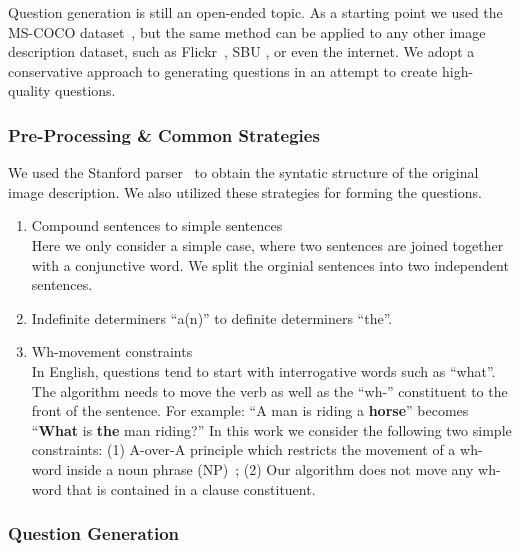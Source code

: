 \documentclass{article} %
\renewcommand{\#}[1]{\textbf{#1}}
\begin{document}
Question generation is still an open-ended topic. As a starting point we used
the MS-COCO dataset~\cite{mscoco}, but the same method can be applied to any
other image description dataset, such as Flickr~\cite{flickr8k}, SBU
\cite{ordonez11}, or even the internet. We adopt a conservative approach to
generating questions in an attempt to create high-quality questions.

\subsubsection{Pre-Processing \& Common Strategies}

We used the Stanford parser~\cite{klein03} to obtain the syntatic structure of
the original image description. We also utilized these strategies for forming
the questions.

\begin{enumerate}[leftmargin=*]

\item Compound sentences to simple sentences \\ Here we only consider a simple
case, where two sentences are joined together with a conjunctive word. We split
the orginial sentences into two independent sentences.

\item Indefinite determiners ``a(n)'' to definite determiners ``the''.

\item Wh-movement constraints \\ In English, questions tend to start with
interrogative words such as ``what''. The algorithm needs to move the verb as
well as the ``wh-'' constituent to the front of the sentence. For example: ``A
man is riding a \textbf{horse}'' becomes   ``\textbf{What} is \textbf{the} man
riding?'' In this work we consider the following two simple constraints: (1)
A-over-A principle which restricts the movement of a wh-word inside a noun
phrase (NP)~\cite{chomsky73}; (2) Our algorithm does not move any wh-word that
is contained in a clause constituent.

\end{enumerate}

\subsubsection{Question Generation}
\end{document}
